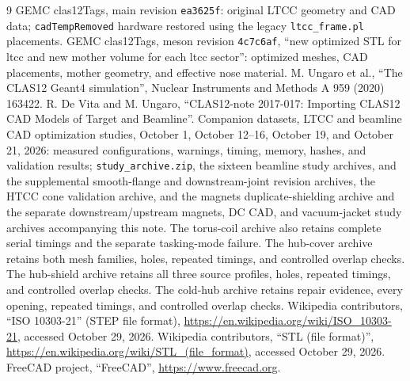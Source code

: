 \FloatBarrier
\begin{thebibliography}{9}
GEMC clas12Tags, main revision \texttt{ea3625f}: original LTCC geometry and CAD data;
\texttt{cadTempRemoved} hardware restored using the legacy \texttt{ltcc\_frame.pl} placements.
GEMC clas12Tags, meson revision \texttt{4c7c6af}, ``new optimized STL for ltcc and new mother
volume for each ltcc sector'': optimized meshes, CAD placements, mother geometry, and effective nose material.
M. Ungaro et al., ``The CLAS12 Geant4 simulation'', Nuclear Instruments and Methods A 959 (2020) 163422.
R. De Vita and M. Ungaro, ``CLAS12-note 2017-017: Importing CLAS12 CAD Models of Target and Beamline''.
Companion datasets, LTCC and beamline CAD optimization studies, October 1, October 12--16, October 19, and
October 21,
2026:
measured configurations, warnings, timing, memory, hashes, and validation results;
\texttt{study\_archive.zip}, the sixteen beamline study archives, and the supplemental smooth-flange and
downstream-joint
revision archives, the HTCC cone validation archive, and the magnets duplicate-shielding archive
and the separate downstream/upstream magnets, DC CAD, and vacuum-jacket study archives accompanying this note.
The torus-coil archive also retains complete serial timings and the separate tasking-mode failure.
The hub-cover archive retains both mesh families, holes, repeated timings, and controlled overlap checks.
The hub-shield archive retains all three source profiles, holes, repeated timings, and controlled overlap checks.
The cold-hub archive retains repair evidence, every opening, repeated timings, and controlled overlap checks.
Wikipedia contributors, ``ISO 10303-21'' (STEP file format),
\url{https://en.wikipedia.org/wiki/ISO_10303-21}, accessed October 29, 2026.
Wikipedia contributors, ``STL (file format)'',
\url{https://en.wikipedia.org/wiki/STL_(file_format)}, accessed October 29, 2026.
FreeCAD project, ``FreeCAD'', \url{https://www.freecad.org}.
\end{thebibliography}
